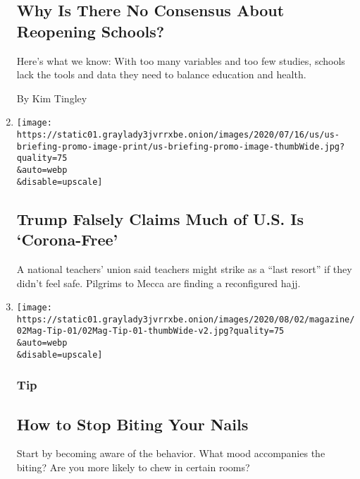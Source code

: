 \begin{enumerate}
  \hypertarget{why-is-there-no-consensus-about-reopening-schools}{%
  \subsection{Why Is There No Consensus About Reopening
  Schools?}\label{why-is-there-no-consensus-about-reopening-schools}}

  Here's what we know: With too many variables and too few studies,
  schools lack the tools and data they need to balance education and
  health.

  By Kim Tingley
\item
  \href{/2020/07/28/world/coronavirus-covid-19.html}{}

  \texttt{[image: https://static01.graylady3jvrrxbe.onion/images/2020/07/16/us/us-briefing-promo-image-print/us-briefing-promo-image-thumbWide.jpg?quality=75\\\&auto=webp\\\&disable=upscale]}

  \hypertarget{trump-falsely-claims-much-of-us-is-corona-free}{%
  \subsection{Trump Falsely Claims Much of U.S. Is
  `Corona-Free'}\label{trump-falsely-claims-much-of-us-is-corona-free}}

  A national teachers' union said teachers might strike as a ``last
  resort'' if they didn't feel safe. Pilgrims to Mecca are finding a
  reconfigured hajj.
\item
  \href{/2020/07/28/magazine/how-to-stop-biting-your-nails.html}{}

  \texttt{[image: https://static01.graylady3jvrrxbe.onion/images/2020/08/02/magazine/02Mag-Tip-01/02Mag-Tip-01-thumbWide-v2.jpg?quality=75\\\&auto=webp\\\&disable=upscale]}

  \hypertarget{tip-}{%
  \subsubsection{Tip }\label{tip-}}

  \hypertarget{how-to-stop-biting-your-nails}{%
  \subsection{How to Stop Biting Your
  Nails}\label{how-to-stop-biting-your-nails}}

  Start by becoming aware of the behavior. What mood accompanies the
  biting? Are you more likely to chew in certain rooms?


\end{enumerate}

